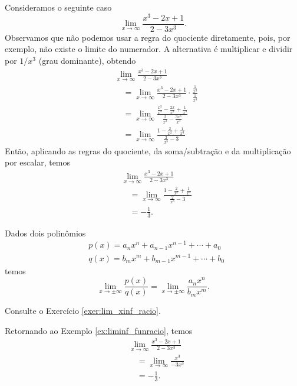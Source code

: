 \begin{ex}\label{ex:liminf_funracio}
  Consideramos o seguinte caso
  \begin{equation}
    \lim_{x\to \infty} \frac{x^3 - 2x + 1}{2 - 3x^3}.
  \end{equation}
  Observamos que não podemos usar a regra do quociente diretamente, pois, por exemplo, não existe o limite do numerador.
  A alternativa é multiplicar e dividir por $1/x^3$ (grau dominante), obtendo
  \begin{align}
    & \lim_{x\to \infty} \frac{x^3 - 2x + 1}{2 - 3x^3} \\
    & \text{}\quad = \lim_{x\to\infty} \frac{x^3 - 2x + 1}{2 - 3x^3}\cdot\frac{\frac{1}{x^3}}{\frac{1}{x^3}} \\
    & \text{}\quad = \lim_{x\to\infty} \frac{\frac{x^3}{x^3}-\frac{2x}{x^3} + \frac{1}{x^3}}{\frac{2}{x^3}-\frac{3x^3}{x^3}} \\
    & \text{}\quad = \lim_{x\to\infty} \frac{1-\frac{2}{x^2} + \frac{1}{x^3}}{\frac{2}{x^3}-3}
  \end{align}
  Então, aplicando as regras do quociente, da soma/subtração e da multiplicação por escalar, temos
  \begin{align}
    & \lim_{x\to\infty} \frac{x^3 - 2x + 1}{2 - 3x^3} \\
    & \text{}\quad = \lim_{x\to\infty} \frac{1-\frac{2}{x^2} + \frac{1}{x^3}}{\frac{2}{x^3}-3} \\
    & \text{}\quad = -\frac{1}{3}.
  \end{align}
\end{ex}

\begin{prop}\label{prop:lim_xinf_racio}
  Dados dois polinômios
  \begin{align}
    & p(x) = a_nx^n+a_{n-1}x^{n-1}+\cdots + a_0 \\
    & q(x) = b_mx^m+b_{m-1}x^{m-1}+\cdots + b_0
\end{align}
temos
\begin{equation}
  \lim_{x\to \pm\infty} \frac{p(x)}{q(x)} = \lim_{x\to\pm\infty}\frac{a_nx^n}{b_mx^m}.
\end{equation}
\end{prop}
\begin{dem}
  Consulte o Exercício \ref{exer:lim_xinf_racio}.
\end{dem}

\begin{ex}
  Retornando ao Exemplo \ref{ex:liminf_funracio}, temos
  \begin{align}
    & \lim_{x\to\infty} \frac{x^3 - 2x + 1}{2 - 3x^3} \\
    & \text{}\quad = \lim_{x\to\infty} \frac{x^3}{-3x^3} \\
    & \text{}\quad = -\frac{1}{3}.
  \end{align}
\end{ex}

